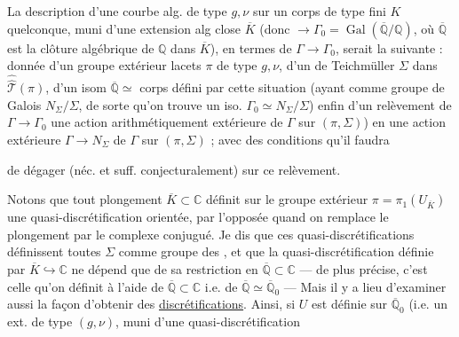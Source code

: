 La description d'une  courbe alg. de type $g,\nu$ sur un corps  de type fini  $K$ quelconque, muni d'une extension alg close $\overline K$ (donc  $\longrightarrow\Gamma_0=\operatorname{Gal}(\overline{\mathbb Q}/\mathbb Q)$, où $\overline{\mathbb Q}$ est la clôture algébrique de $\mathbb Q$ dans $\overline K$), en termes de $\Gamma\longrightarrow\Gamma_0$, serait la suivante : donnée d'un groupe extérieur  lacets $\pi$ de type $g,\nu$, d'un  de Teichmüller $\Sigma$ dans $\widehat{\widehat{\mathcal T}}(\pi)$, d'un isom $\overline{\mathbb Q}\simeq$ corps défini par cette situation (ayant comme groupe de Galois  $N_\Sigma/\Sigma$, de sorte qu'on trouve un iso. $\Gamma_0\simeq N_\Sigma/\Sigma$) enfin d'un relèvement de $\Gamma\longrightarrow\Gamma_0$   une action arithmétiquement extérieure de $\Gamma$ sur $(\pi,\Sigma)$) en une action extérieure $\Gamma\longrightarrow N_\Sigma$ de $\Gamma$ sur $(\pi,\Sigma)$ ; avec des conditions qu'il faudra 

de dégager (néc. et suff. conjecturalement) sur ce relèvement.

Notons que tout plongement $\overline K\subset\mathbb C$
définit  sur le groupe extérieur
$\pi=\pi_1(U_{\overline K})$
une quasi-discrétification orientée, 
par l'opposée quand on remplace le plongement par le complexe conjugué.
  Je dis que ces
quasi-discrétifications définissent toutes $\Sigma$ comme groupe des
, et que la quasi-discrétification
définie par $\overline K\hookrightarrow\mathbb C$ ne dépend que de
sa restriction en
$\overline{\mathbb Q}\subset\mathbb C$
--- de  plus précise, c'est celle qu'on définit
 à l'aide de $\overline{\mathbb Q}\subset\mathbb C$ i.e. de
$\overline{\mathbb Q}\simeq\overline{\mathbb Q}_0$
--- Mais il y a lieu d'examiner aussi la façon d'obtenir des
\uline{discrétifications}. Ainsi, si  $U$ est définie
sur $\overline{\mathbb Q}_0$ (i.e. un \unsure{$\pi$|$\Pi$} ext. de type
$(g,\nu)$, muni d'une quasi-discrétification

